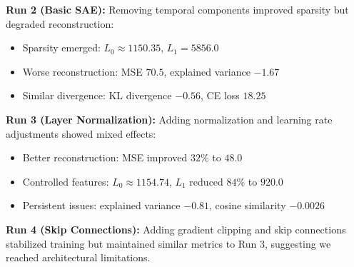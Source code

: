 \documentclass{article} %
\begin{document}
\textbf{Run 2 (Basic SAE):} Removing temporal components improved sparsity but degraded reconstruction:
\begin{itemize}
    \item Sparsity emerged: $L_0 \approx 1150.35$, $L_1 = 5856.0$
    \item Worse reconstruction: MSE $70.5$, explained variance $-1.67$
    \item Similar divergence: KL divergence $-0.56$, CE loss $18.25$
\end{itemize}

\textbf{Run 3 (Layer Normalization):} Adding normalization and learning rate adjustments showed mixed effects:
\begin{itemize}
    \item Better reconstruction: MSE improved $32\%$ to $48.0$
    \item Controlled features: $L_0 \approx 1154.74$, $L_1$ reduced $84\%$ to $920.0$
    \item Persistent issues: explained variance $-0.81$, cosine similarity $-0.0026$
\end{itemize}

\textbf{Run 4 (Skip Connections):} Adding gradient clipping and skip connections stabilized training but maintained similar metrics to Run 3, suggesting we reached architectural limitations.
\end{document}
